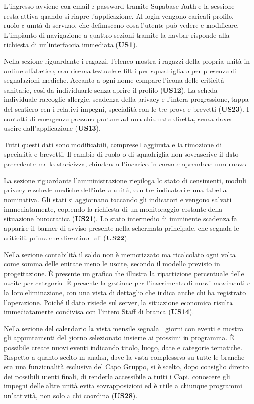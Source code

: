 \documentclass[11pt]{article}
\numberwithin{figure}{section}
\begin{document}
L'ingresso avviene con email e password tramite Supabase Auth e la sessione resta attiva quando si riapre l'applicazione. Al login vengono caricati profilo, ruolo e unità di servizio, che definiscono cosa l'utente può vedere e modificare. L'impianto di navigazione a quattro sezioni tramite la navbar risponde alla richiesta di un'interfaccia immediata (\textbf{US1}).

Nella sezione riguardante i ragazzi, l'elenco mostra i ragazzi della propria unità in ordine alfabetico, con ricerca testuale e filtri per squadriglia o per presenza di segnalazioni mediche. Accanto a ogni nome compare l'icona delle criticità sanitarie, così da individuarle senza aprire il profilo (\textbf{US12}). La scheda individuale raccoglie allergie, scadenza della privacy e l'intera progressione, tappa del sentiero con i relativi impegni, specialità con le tre prove e brevetti (\textbf{US23}). I contatti di emergenza possono portare ad una chiamata diretta, senza dover uscire dall'applicazione (\textbf{US13}).

Tutti questi dati sono modificabili, comprese l'aggiunta e la rimozione di specialità e brevetti. Il cambio di ruolo o di squadriglia non sovrascrive il dato precedente ma lo storicizza, chiudendo l'incarico in corso e aprendone uno nuovo.

La sezione riguardante l'amministrazione riepiloga lo stato di censimenti, moduli privacy e schede mediche dell'intera unità, con tre indicatori e una tabella nominativa. Gli stati si aggiornano toccando gli indicatori e vengono salvati immediatamente, coprendo la richiesta di un monitoraggio costante della situazione burocratica (\textbf{US21}). Lo stato intermedio di imminente scadenza fa apparire il banner di avviso presente nella schermata principale, che segnala le criticità prima che diventino tali (\textbf{US22}).

Nella sezione contabilità il saldo non è memorizzato ma ricalcolato ogni volta come somma delle entrate meno le uscite, secondo il modello previsto in progettazione. È presente un grafico che illustra la ripartizione percentuale delle uscite per categoria. È presente la gestione per l'inserimento di nuovi movimenti e la loro eliminazione, con una vista di dettaglio che indica anche chi ha registrato l'operazione. Poiché il dato risiede sul server, la situazione economica risulta immediatamente condivisa con l'intero Staff di branca (\textbf{US14}).

Nella sezione del calendario la vista mensile segnala i giorni con eventi e mostra gli appuntamenti del giorno selezionato insieme ai prossimi in programma. È possibile creare nuovi eventi indicando titolo, luogo, date e categorie tematiche. Rispetto a quanto scelto in analisi, dove la vista complessiva su tutte le branche era una funzionalità esclusiva del Capo Gruppo, si è scelto, dopo consiglio diretto dei possibili utenti finali, di renderla accessibile a tutti i Capi, conoscere gli impegni delle altre unità evita sovrapposizioni ed è utile a chiunque programmi un'attività, non solo a chi coordina (\textbf{US28}).
\end{document}
